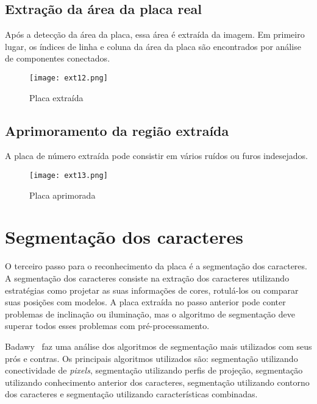 \subsection{Extração da área da placa real}

Após a detecção da área da placa, essa área é extraída da imagem. Em primeiro
lugar, os índices de linha e coluna da área da placa são encontrados por análise
de componentes conectados.

\begin{figure}[H]
	\centering
	\texttt{[image: ext12.png]}
	\caption{Placa extraída}
	\label{fig:ext_true_number_plate}
\end{figure}

\subsection{Aprimoramento da região extraída}

A placa de número extraída pode consistir em vários ruídos ou furos indesejados.

\begin{figure}[H]
	\centering
	\texttt{[image: ext13.png]}
	\caption{Placa aprimorada}
	\label{fig:ext_enhanced_number_plate}
\end{figure}

\section{Segmentação dos caracteres}
\label{sec:segmentacao}

O terceiro passo para o reconhecimento da placa é a segmentação dos caracteres.
A segmentação dos caracteres consiste na extração dos caracteres utilizando
estratégias como projetar as suas informações de cores, rotulá-los ou comparar
suas posições com modelos. A placa extraída no passo anterior pode conter
problemas de inclinação ou iluminação, mas o algoritmo de segmentação deve
superar todos esses problemas com pré-processamento.~\cite{s2013automatic}

Badawy~\cite{s2013automatic} faz uma análise dos algoritmos de segmentação mais
utilizados com seus prós e contras.  Os principais algoritmos utilizados são:
segmentação utilizando conectividade de \emph{pixels}, segmentação utilizando
perfis de projeção, segmentação utilizando conhecimento anterior dos caracteres,
segmentação utilizando contorno dos caracteres e segmentação utilizando
características combinadas.


